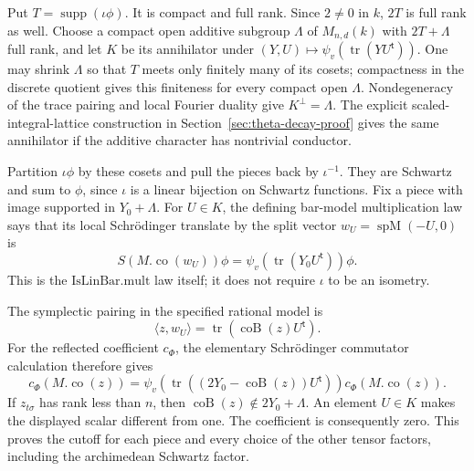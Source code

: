 Put \(T=\operatorname{supp}(\iota\phi)\).
It is compact and full rank. Since \(2\ne0\) in \(k\),
\(2T\) is full rank as well. Choose a compact open
additive subgroup \(\Lambda\) of \(M_{n,d}(k)\) with
\(2T+\Lambda\) full rank, and let \(K\) be its annihilator
under \((Y,U)\mapsto\psi_v(\operatorname{tr}(YU^{\mathsf t}))\).
One may shrink \(\Lambda\) so that \(T\) meets only
finitely many of its cosets; compactness in the
discrete quotient gives this finiteness for every
compact open \(\Lambda\).
Nondegeneracy of the trace pairing and local Fourier
duality give \(K^\perp=\Lambda\).
The explicit scaled-integral-lattice construction in
Section~\ref{sec:theta-decay-proof} gives the same
annihilator if the additive character has nontrivial
conductor.

Partition \(\iota\phi\) by these cosets and pull the
pieces back by \(\iota^{-1}\). They are Schwartz and
sum to \(\phi\), since \(\iota\) is a linear bijection
on Schwartz functions. Fix a piece with image supported
in \(Y_0+\Lambda\). For \(U\in K\), the defining
bar-model multiplication law says that its local
Schr\"odinger translate by the split vector
\(w_U=\operatorname{spM}(-U,0)\) is
\[
       S(M.\operatorname{co}(w_U))\phi
          =\psi_v(\operatorname{tr}(Y_0U^{\mathsf t}))\phi.
\]
This is the \(\mathrm{IsLinBar.mult}\) law itself;
it does not require \(\iota\) to be an isometry.

The symplectic pairing in the specified rational model is
\[
 \langle z,w_U\rangle
                 =\operatorname{tr}(\operatorname{coB}(z)U^{\mathsf t}).
\]
For the reflected coefficient \(c_\Phi\), the elementary
Schr\"odinger commutator calculation therefore gives
\[
 c_\Phi(M.\operatorname{co}(z))
   =\psi_v\!\left(
        \operatorname{tr}((2Y_0-\operatorname{coB}(z))U^{\mathsf t})
             \right)c_\Phi(M.\operatorname{co}(z)).
\]
If \(z_{t\sigma}\) has rank less than \(n\), then
\(\operatorname{coB}(z)\notin2Y_0+\Lambda\).
An element \(U\in K\) makes the displayed scalar
different from one. The coefficient is consequently
zero. This proves the cutoff for each piece and every
choice of the other tensor factors, including the
archimedean Schwartz factor.

